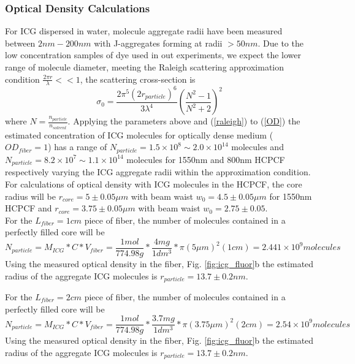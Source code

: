 \clearpage
\subsubsection{Optical Density Calculations}
 For ICG dispersed in water, molecule aggregate radii have been measured between $2nm - 200nm$ \cite{dedora} with J-aggregates forming at radii $>50nm$\cite{weigand}. Due to the low concentration samples of dye used in out experiments, we expect the lower range of molecule diameter, meeting the Raleigh scattering approximation condition $\frac{2\pi r}{\lambda} <<1$, the scattering cross-section is 
\begin{equation}
	\sigma_0 = \frac{2\pi^5 (2r_{particle})^6}{3\lambda^4}(\frac{N^2 -1}{N^2+2})^2
	\label{raleigh}
\end{equation}
where $N=\frac{n_{particle}}{n_{solvent}}$. Applying the parameters above and  (\ref{raleigh}) to (\ref{OD}) the estimated concentration of ICG molecules for optically dense medium ($OD_{fiber}=1$) has a range of $N_{particle} = 1.5\times 10^8 \sim 2.0\times 10^{14}$ molecules and $N_{particle} = 8.2\times 10^7 \sim 1.1\times 10^{14}$ molecules for 1550nm and 800nm HCPCF respectively varying the ICG aggregate radii within the approximation condition. \\

For calculations of optical density with ICG molecules in the HCPCF, the core radius will be  $r_{core} = 5\pm 0.05\mu m$ with beam waist $w_0 = 4.5 \pm 0.05\mu m$ for 1550nm HCPCF and $r_{core} = 3.75 \pm0.05\mu m$ with beam waist $w_0 = 2.75 \pm 0.05$.\\
For the $L_{fiber}=1cm$  piece of fiber, the number of molecules contained in a perfectly filled core will be
\begin{equation}
	N_{particle} = M_{ICG}*C*V_{fiber}=\frac{1 mol}{774.98g}*\frac{4mg}{1dm^3}*\pi(5\mu m)^2(1cm) = 2.441\times10^9 molecules
\end{equation} 
Using the measured optical density in the fiber, Fig. \ref{fig:icg_fluor}b the estimated radius of the aggregate ICG molecules is $r_{particle} = 13.7 \pm 0.2nm$.  

For the $L_{fiber}=2cm$  piece of fiber, the number of molecules contained in a perfectly filled core will be
\begin{equation}
	N_{particle} = M_{ICG}*C*V_{fiber}=\frac{1 mol}{774.98g}*\frac{3.7mg}{1dm^3}*\pi(3.75\mu m)^2(2cm) = 2.54×10^9 molecules
\end{equation} 
Using the measured optical density in the fiber, Fig. \ref{fig:icg_fluor}b the estimated radius of the aggregate ICG molecules is $r_{particle} = 13.7 \pm 0.2nm$.  

\clearpage